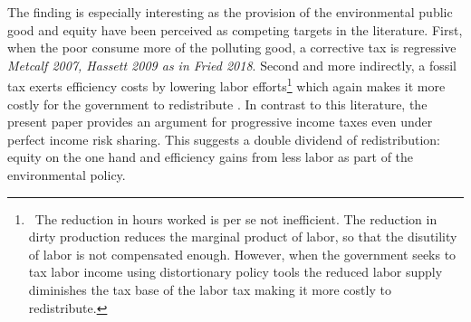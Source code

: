 The finding is especially interesting as the provision of the environmental public good and equity have been perceived as competing targets in the literature. First, when the poor consume more of the polluting good, a corrective tax is regressive \citep{Sager2019IncomeCurves, Fried2018ClimateAnalysis} \textit{Metcalf 2007, Hassett 2009 as  in Fried 2018}. Second and more indirectly, a fossil tax exerts efficiency costs by lowering labor efforts\footnote{\ The reduction in hours worked is per se not inefficient. The reduction in dirty production reduces the marginal product of labor, so that the disutility of labor is not compensated enough. However, when the government seeks to tax labor income using distortionary policy tools the reduced labor supply diminishes the tax base of the labor tax making it more costly to redistribute.} which again makes it more costly for the government to redistribute \citep{Dobkowitz2022}. 
In contrast to this literature, the present paper provides an argument for progressive income taxes even under perfect income risk sharing. This suggests a double dividend of redistribution: equity on the one hand and efficiency gains from less labor as part of the environmental policy.
